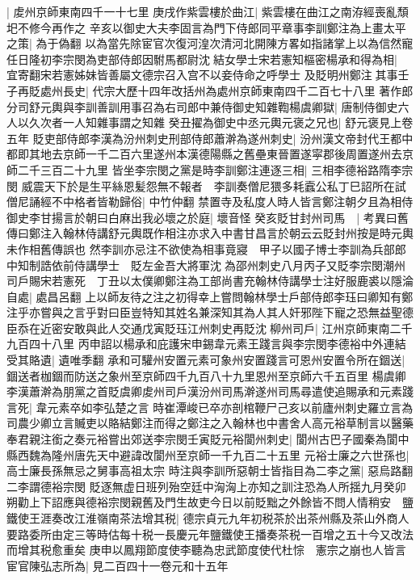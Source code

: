 |{
	䖍州京師東南四千一十七里}
庚戌作紫雲樓於曲江|{
	紫雲樓在曲江之南洊經喪亂頹圯不修今再作之}
辛亥以御史大夫李固言為門下侍郎同平章事李訓鄭注為上畫太平之策|{
	為于偽翻}
以為當先除宦官次復河湟次清河北開陳方畧如指諸掌上以為信然寵任日隆初李宗閔為吏部侍郎因駙馬都尉沈結女學士宋若憲知樞密楊承和得為相|{
	宜寄翻宋若憲姊妹皆善屬文德宗召入宫不以妾侍命之呼學士}
及貶明州鄭注其事壬子再貶處州長史|{
	代宗大歷十四年改括州為處州京師東南四千二百七十八里}
著作郎分司舒元輿與李訓善訓用事召為右司郎中兼侍御史知雜鞫楊虞卿獄|{
	唐制侍御史六人以久次者一人知雜事謂之知雜}
癸丑擢為御史中丞元輿元褒之兄也|{
	舒元褒見上卷五年}
貶吏部侍郎李漢為汾州刺史刑部侍郎蕭澣為遂州刺史|{
	汾州漢文帝封代王都中都即其地去京師一千二百六里遂州本漢德陽縣之舊壘東晉置遂寜郡後周置遂州去京師二千三百二十九里}
皆坐李宗閔之黨是時李訓鄭注連逐三相|{
	三相李德裕路隋李宗閔}
威震天下於是生平絲恩髪怨無不報者　李訓奏僧尼猥多耗蠧公私丁巳詔所在試僧尼誦經不中格者皆勒歸俗|{
	中竹仲翻}
禁置寺及私度人時人皆言鄭注朝夕且為相侍御史李甘揚言於朝曰白麻出我必壞之於庭|{
	壞音怪}
癸亥貶甘封州司馬　|{
	考異曰舊傳曰鄭注入翰林侍講舒元輿既作相注亦求入中書甘昌言於朝云云貶封州按是時元輿未作相舊傳誤也}
然李訓亦忌注不欲使為相事竟寢　甲子以國子博士李訓為兵部郎中知制誥依前侍講學士　貶左金吾大將軍沈為邵州刺史八月丙子又貶李宗閔潮州司戶賜宋若憲死　丁丑以太僕卿鄭注為工部尚書充翰林侍講學士注好服鹿裘以隱淪自處|{
	處昌呂翻}
上以師友待之注之初得幸上嘗問翰林學士戶部侍郎李珏曰卿知有鄭注乎亦嘗與之言乎對曰臣豈特知其姓名兼深知其為人其人奸邪陛下寵之恐無益聖德臣忝在近密安敢與此人交通戊寅貶珏江州刺史再貶沈柳州司戶|{
	江州京師東南二千九百四十八里}
丙申詔以楊承和庇護宋申錫韋元素王踐言與李宗閔李德裕中外連結受其賂遺|{
	遺唯季翻}
承和可驩州安置元素可象州安置踐言可恩州安置令所在錮送|{
	錮送者枷錮而防送之象州至京師四千九百八十九里恩州至京師六千五百里}
楊虞卿李漢蕭澣為朋黨之首貶虞卿䖍州司戶漢汾州司馬澣遂州司馬尋遣使追賜承和元素踐言死|{
	韋元素卒如李弘楚之言}
時崔潭峻已卒亦剖棺鞭尸己亥以前廬州刺史羅立言為司農少卿立言贓吏以賂結鄭注而得之鄭注之入翰林也中書舍人高元裕草制言以醫藥奉君親注銜之奏元裕嘗出郊送李宗閔壬寅貶元裕閬州刺史|{
	閬州古巴子國秦為閬中縣西魏為隆州唐先天中避諱改閬州至京師一千九百二十五里}
元裕士廉之六世孫也|{
	高士廉長孫無忌之舅事高祖太宗}
時注與李訓所惡朝士皆指目為二李之黨|{
	惡烏路翻二李謂德裕宗閔}
貶逐無虚日班列殆空廷中洶洶上亦知之訓注恐為人所揺九月癸卯朔勸上下詔應與德裕宗閔親舊及門生故吏今日以前貶黜之外餘皆不問人情稍安　鹽鐵使王涯奏改江淮嶺南茶法增其税|{
	德宗貞元九年初税茶於出茶州縣及茶山外商人要路委所由定三等時估每十税一長慶元年鹽鐵使王播奏茶税一百增之五十今又改法而增其税愈重矣}
庚申以鳳翔節度使李聽為忠武節度使代杜悰　憲宗之崩也人皆言宦官陳弘志所為|{
	見二百四十一卷元和十五年}
